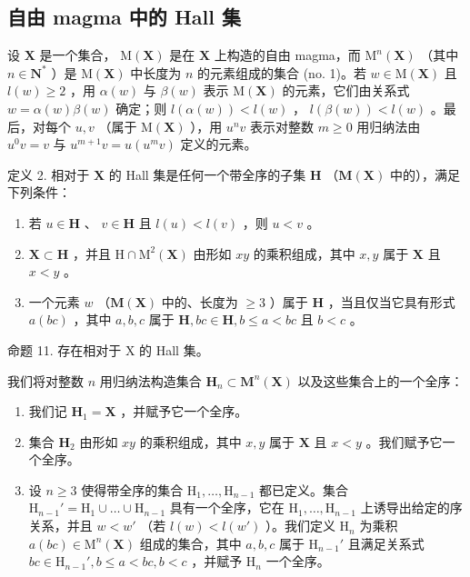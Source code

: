 \subsection{自由 magma 中的 Hall 集}

设 \(\mathbf{X}\) 是一个集合， \(\mathrm{M}(\mathbf{X})\) 是在 \(\mathbf{X}\) 上构造的自由 magma，而 \(\mathrm{M}^n (\mathbf{X})\) （其中 \(n\in \mathbf{N}^*\) ）是 \(\mathrm{M}(\mathbf{X})\) 中长度为 \(n\) 的元素组成的集合 (no. 1)。若 \(w\in \mathrm{M}(\mathbf{X})\) 且 \(l(w)\geqslant 2\) ，用 \(\alpha (w)\) 与 \(\beta (w)\) 表示 \(\mathrm{M}(\mathbf{X})\) 的元素，它们由关系式 \(w = \alpha (w)\beta (w)\) 确定；则 \(l(\alpha (w)) < l(w)\) ， \(l(\beta (w)) < l(w)\) 。最后，对每个 \(u,v\) （属于 \(\mathrm{M}(\mathbf{X})\) ），用 \(u^n v\) 表示对整数 \(m\geqslant 0\) 用归纳法由 \(u^{0}v = v\) 与 \(u^{m + 1}v = u(u^{m}v)\) 定义的元素。

定义 2. 相对于 \(\mathbf{X}\) 的 Hall 集是任何一个带全序的子集 \(\mathbf{H}\) （\(\mathbf{M}(\mathbf{X})\) 中的），满足下列条件：

\begin{enumerate}
\def\labelenumi{(\Alph{enumi})}
\item
  若 \(u \in \mathbf{H}\) 、 \(v \in \mathbf{H}\) 且 \(l(u) < l(v)\) ，则 \(u < v\) 。
\item
  \(\mathbf{X} \subset \mathbf{H}\) ，并且 \(\mathrm{H} \cap \mathrm{M}^2(\mathbf{X})\) 由形如 \(xy\) 的乘积组成，其中 \(x, y\) 属于 \(\mathbf{X}\) 且 \(x < y\) 。
\item
  一个元素 \(w\) （\(\mathbf{M}(\mathbf{X})\) 中的、长度为 \(\geqslant 3\) ）属于 \(\mathbf{H}\) ，当且仅当它具有形式 \(a(bc)\) ，其中 \(a, b, c\) 属于 \(\mathbf{H}, bc \in \mathbf{H}, b \leqslant a < bc\) 且 \(b < c\) 。
\end{enumerate}

命题 11. 存在相对于 X 的 Hall 集。

我们将对整数 \(n\) 用归纳法构造集合 \(\mathbf{H}_n \subset \mathbf{M}^n(\mathbf{X})\) 以及这些集合上的一个全序：

\begin{enumerate}
\def\labelenumi{(\alph{enumi})}
\item
  我们记 \(\mathbf{H}_1 = \mathbf{X}\) ，并赋予它一个全序。
\item
  集合 \(\mathbf{H}_2\) 由形如 \(xy\) 的乘积组成，其中 \(x, y\) 属于 \(\mathbf{X}\) 且 \(x < y\) 。我们赋予它一个全序。
\item
  设 \(n \geqslant 3\) 使得带全序的集合 \(\mathrm{H}_1, \ldots, \mathrm{H}_{n-1}\) 都已定义。集合 \(\mathrm{H}_{n-1}' = \mathrm{H}_1 \cup \dots \cup \mathrm{H}_{n-1}\) 具有一个全序，它在 \(\mathrm{H}_1, \ldots, \mathrm{H}_{n-1}\) 上诱导出给定的序关系，并且 \(w < w'\) （若 \(l(w) < l(w')\) ）。我们定义 \(\mathrm{H}_n\) 为乘积 \(a(bc) \in \mathrm{M}^n(\mathbf{X})\) 组成的集合，其中 \(a, b, c\) 属于 \(\mathrm{H}_{n-1}'\) 且满足关系式 \(bc \in \mathrm{H}_{n-1}', b \leqslant a < bc, b < c\) ，并赋予 \(\mathrm{H}_n\) 一个全序。
\end{enumerate}


